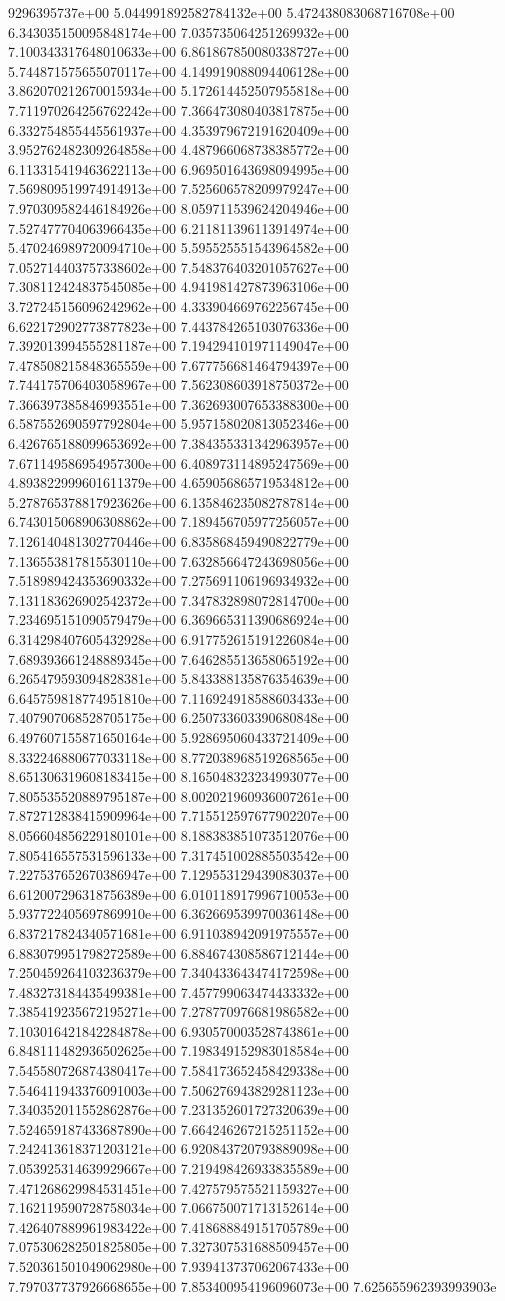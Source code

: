 9296395737e+00	5.044991892582784132e+00	5.472438083068716708e+00	6.343035150095848174e+00	7.035735064251269932e+00	7.100343317648010633e+00	6.861867850080338727e+00	5.744871575655070117e+00	4.149919088094406128e+00	3.862070212670015934e+00	5.172614452507955818e+00	7.711970264256762242e+00	7.366473080403817875e+00	6.332754855445561937e+00	4.353979672191620409e+00	3.952762482309264858e+00	4.487966068738385772e+00	6.113315419463622113e+00	6.969501643698094995e+00	7.569809519974914913e+00	7.525606578209979247e+00	7.970309582446184926e+00	8.059711539624204946e+00	7.527477704063966435e+00	6.211811396113914974e+00	5.470246989720094710e+00	5.595525551543964582e+00	7.052714403757338602e+00	7.548376403201057627e+00	7.308112424837545085e+00	4.941981427873963106e+00	3.727245156096242962e+00	4.333904669762256745e+00	6.622172902773877823e+00	7.443784265103076336e+00	7.392013994555281187e+00	7.194294101971149047e+00	7.478508215848365559e+00	7.677756681464794397e+00	7.744175706403058967e+00	7.562308603918750372e+00	7.366397385846993551e+00	7.362693007653388300e+00	6.587552690597792804e+00	5.957158020813052346e+00	6.426765188099653692e+00	7.384355331342963957e+00	7.671149586954957300e+00	6.408973114895247569e+00	4.893822999601611379e+00	4.659056865719534812e+00	5.278765378817923626e+00	6.135846235082787814e+00	6.743015068906308862e+00	7.189456705977256057e+00	7.126140481302770446e+00	6.835868459490822779e+00	7.136553817815530110e+00	7.632856647243698056e+00	7.518989424353690332e+00	7.275691106196934932e+00	7.131183626902542372e+00	7.347832898072814700e+00	7.234695151090579479e+00	6.369665311390686924e+00	6.314298407605432928e+00	6.917752615191226084e+00	7.689393661248889345e+00	7.646285513658065192e+00	6.265479593094828381e+00	5.843388135876354639e+00	6.645759818774951810e+00	7.116924918588603433e+00	7.407907068528705175e+00	6.250733603390680848e+00	6.497607155871650164e+00	5.928695060433721409e+00	8.332246880677033118e+00	8.772038968519268565e+00	8.651306319608183415e+00	8.165048323234993077e+00	7.805535520889795187e+00	8.002021960936007261e+00	7.872712838415909964e+00	7.715512597677902207e+00	8.056604856229180101e+00	8.188383851073512076e+00	7.805416557531596133e+00	7.317451002885503542e+00	7.227537652670386947e+00	7.129553129439083037e+00	6.612007296318756389e+00	6.010118917996710053e+00	5.937722405697869910e+00	6.362669539970036148e+00	6.837217824340571681e+00	6.911038942091975557e+00	6.883079951798272589e+00	6.884674308586712144e+00	7.250459264103236379e+00	7.340433643474172598e+00	7.483273184435499381e+00	7.457799063474433332e+00	7.385419235672195271e+00	7.278770976681986582e+00	7.103016421842284878e+00	6.930570003528743861e+00	6.848111482936502625e+00	7.198349152983018584e+00	7.545580726874380417e+00	7.584173652458429338e+00	7.546411943376091003e+00	7.506276943829281123e+00	7.340352011552862876e+00	7.231352601727320639e+00	7.524659187433687890e+00	7.664246267215251152e+00	7.242413618371203121e+00	6.920843720793889098e+00	7.053925314639929667e+00	7.219498426933835589e+00	7.471268629984531451e+00	7.427579575521159327e+00	7.162119590728758034e+00	7.066750071713152614e+00	7.426407889961983422e+00	7.418688849151705789e+00	7.075306282501825805e+00	7.327307531688509457e+00	7.520361501049062980e+00	7.939413737062067433e+00	7.797037737926668655e+00	7.853400954196096073e+00	7.625655962393993903e